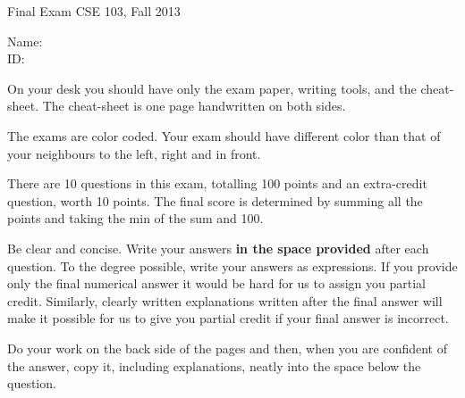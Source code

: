{\textbf \Large Final Exam} \hfill CSE 103, Fall 2013
\\

\vspace{.25in}

Name: \underline{\hspace{3in}}
\\

ID: \underline{\hspace{3.2in}}
\\

\vspace{1in}

On your desk you should have only the exam paper, writing tools, and
the cheat-sheet. The cheat-sheet is one page handwritten on both sides.

The exams are color coded. Your exam should have different color than that of your neighbours to the left, right and in front.

There are 10 questions in this exam, totalling 100 points and an
extra-credit question, worth 10 points. The final score is determined
by summing all the points and taking the min of the sum and 100.

Be clear and concise. Write your answers {\bf in the space provided}
after each question. To the degree possible, write your answers as
expressions. If you provide only the final numerical answer it would
be hard for us to assign you partial credit. Similarly, clearly
written explanations written after the final answer will make it
possible for us to give you partial credit if your final answer is
incorrect.

Do your work on the back side of the pages and then, when you are
confident of the answer, copy it, including explanations, 
neatly into the space below the question.
\vspace{0.4in}

